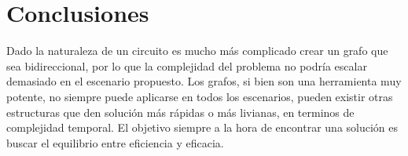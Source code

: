 \documentclass[runningheads]{llncs}
\begin{document}
    \section{Conclusiones}

        Dado la naturaleza de un circuito es mucho más complicado crear un grafo que sea bidireccional, por lo que la complejidad del problema no podría escalar demasiado en el escenario propuesto. Los grafos, si bien son una herramienta muy potente, no siempre puede aplicarse en todos los escenarios, pueden existir otras estructuras que den solución más rápidas o más livianas, en terminos de complejidad temporal. El objetivo siempre a la hora de encontrar una solución es buscar el equilibrio entre eficiencia y eficacia.

    \nocite{*}
    
    
\end{document}
